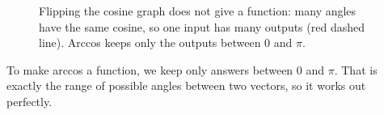 \begin{figure}[H]
    \centering
    \caption{Flipping the cosine graph does not give a function: many angles
    have the same cosine, so one input has many outputs (red dashed line).
    Arccos keeps only the outputs between $0$ and $\pi$.}
    \label{fig:arccos}
\end{figure}

To make arccos a function, we keep only answers between $0$ and $\pi$.
That is exactly the range of possible angles between two vectors, so it
works out perfectly.

